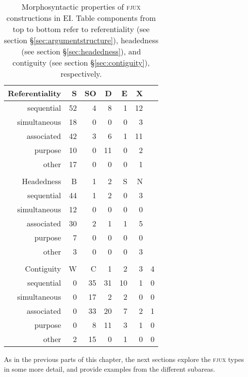 \begin{table}

\centering
\begin{tabular}{rrrrrrr}
  \hline
Referentiality & S & SO & D & E & X \\ 
  \hline
  sequential &  52 &   4 &   8 &   1 &  12 \\ 
  simultaneous &  18 &   0 &   0 &   0 &   3 \\ 
  associated &  42 &   3 &   6 &   1 &  11 \\ 
  purpose &  10 &   0 &  11 &   0 &   2 \\ 
  other &  17 &   0 &   0 &   0 &   1 \\ 
   \hline
 \\
  \hline
Headedness & B & 1 & 2 & S & N \\ 
  \hline
  sequential &  44 &   1 &   2 &   0 &   3 \\ 
  simultaneous &  12 &   0 &   0 &   0 &   0 \\ 
  associated &  30 &   2 &   1 &   1 &   5 \\ 
  purpose &   7 &   0 &   0 &   0 &   0 \\ 
  other &   3 &   0 &   0 &   0 &   3 \\ 
   \hline
 \\
  \hline
Contiguity & W & C & 1 & 2 & 3 & 4 \\ 
  \hline
  sequential &   0 &  35 &  31 &  10 &   1 &   0 \\ 
  simultaneous &   0 &  17 &   2 &   2 &   0 &   0 \\ 
  associated &   0 &  33 &  20 &   7 &   2 &   1 \\ 
  purpose &   0 &   8 &  11 &   3 &   1 &   0 \\ 
  other &   2 &  15 &   0 &   1 &   0 &   0 \\ 
   \hline
\end{tabular}
\caption[Morphosyntactic properties of \textsc{fjux} constructions]{Morphosyntactic properties of \textsc{fjux} constructions in EI. Table components from top to bottom refer to referentiality (see section §\ref{sec:argumentstructure}), headedness (see section §\ref{sec:headedness}), and contiguity (see section §\ref{sec:contiguity}), respectively.}
\label{table:FJUX_formal}

\end{table}

As in the previous parts of this chapter, the next sections explore the \textsc{fjux} types in some more detail, and provide examples from the different subareas.

